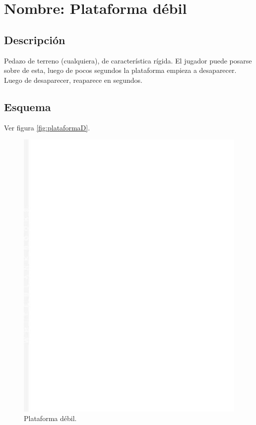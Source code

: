 \section{Nombre: Plataforma débil}\label{obs.plataformaD}
	\subsection{Descripción}
	Pedazo de terreno (cualquiera), de característica rígida. El jugador puede posarse sobre de esta, luego de pocos segundos la plataforma empieza a desaparecer. Luego de desaparecer, reaparece en segundos.
	\subsection{Esquema}
	Ver figura \ref{fig:plataformaD}.
	\begin{figure}
		\centering
		\includegraphics[height=0.2 \textheight]{Imagenes/plataformaD}
		\caption{Plataforma débil.}
		\label{fig:plafarmaD}
	\end{figure}
